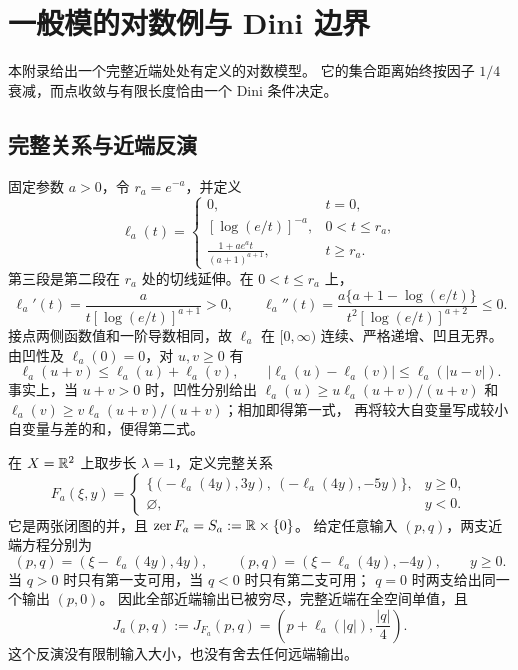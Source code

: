 \section{一般模的对数例与 Dini 边界}
\label{app:general-modulus}

本附录给出一个完整近端处处有定义的对数模型。
它的集合距离始终按因子 $1/4$ 衰减，而点收敛与有限长度恰由一个 Dini 条件决定。

\subsection{完整关系与近端反演}

固定参数 $a>0$，令 $r_a=e^{-a}$，并定义
\begin{equation}
\label{eq:log-global-profile}
 \ell_a(t)=
 \begin{cases}
 0,&t=0,\\
 [\log(e/t)]^{-a},&0<t\le r_a,\\
 \displaystyle\frac{1+ae^at}{(a+1)^{a+1}},&t\ge r_a.
 \end{cases}
\end{equation}
第三段是第二段在 $r_a$ 处的切线延伸。在 $0<t\le r_a$ 上，
\[
 \ell_a'(t)=\frac{a}{t[\log(e/t)]^{a+1}}>0,\qquad
 \ell_a''(t)=\frac{a\{a+1-\log(e/t)\}}
 {t^2[\log(e/t)]^{a+2}}\le0.
\]
接点两侧函数值和一阶导数相同，故 $\ell_a$ 在 $[0,\infty)$
连续、严格递增、凹且无界。
由凹性及 $\ell_a(0)=0$，对 $u,v\ge0$ 有
\begin{equation}
\label{eq:log-subadditivity}
 \ell_a(u+v)\le\ell_a(u)+\ell_a(v),\qquad
 |\ell_a(u)-\ell_a(v)|\le\ell_a(|u-v|).
\end{equation}
事实上，当 $u+v>0$ 时，凹性分别给出
$\ell_a(u)\ge u\ell_a(u+v)/(u+v)$ 和
$\ell_a(v)\ge v\ell_a(u+v)/(u+v)$；相加即得第一式，
再将较大自变量写成较小自变量与差的和，便得第二式。

在 $X=\mathbb R^2$ 上取步长 $\lambda=1$，定义完整关系
\begin{equation}
\label{eq:log-full-operator}
 F_a(\xi,y)=
 \begin{cases}
 \{(-\ell_a(4y),3y),\ (-\ell_a(4y),-5y)\},&y\ge0,\\
 \varnothing,&y<0.
 \end{cases}
\end{equation}
它是两张闭图的并，且 $\operatorname{zer} F_a=S_a:=\mathbb R\times\{0\}$。
给定任意输入 $(p,q)$，两支近端方程分别为
\[
 (p,q)=(\xi-\ell_a(4y),4y),\qquad
 (p,q)=(\xi-\ell_a(4y),-4y),\qquad y\ge0.
\]
当 $q>0$ 时只有第一支可用，当 $q<0$ 时只有第二支可用；
$q=0$ 时两支给出同一个输出 $(p,0)$。
因此全部近端输出已被穷尽，完整近端在全空间单值，且
\begin{equation}
\label{eq:log-complete-prox}
 J_a(p,q):=J_{F_a}(p,q)
 =\left(p+\ell_a(|q|),\frac{|q|}{4}\right).
\end{equation}
这个反演没有限制输入大小，也没有舍去任何远端输出。


